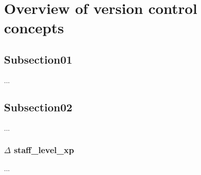 \section{Overview of version control concepts}
    \subsection{Subsection01}
    ...

    \subsection{Subsection02}
    ...

    \subsubsection{$\Delta$ staff\_level\_xp}
    ...
